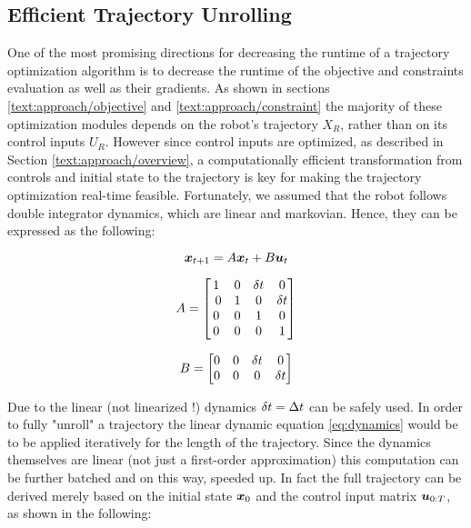 \subsection{Efficient Trajectory Unrolling}
\label{text:approach/runtime/unrolling}
One of the most promising directions for decreasing the runtime of a trajectory optimization algorithm is to decrease the runtime of the objective and constraints evaluation as well as their gradients. As shown in sections \ref{text:approach/objective} and \ref{text:approach/constraint} the majority of these optimization modules depends on the robot's trajectory $X_R$, rather than on its control inputs $U_R$. However since control inputs are optimized, as described in Section \ref{text:approach/overview}, a computationally efficient transformation from controls and initial state to the trajectory is key for making the trajectory optimization real-time feasible.
\newline
Fortunately, we assumed that the robot follows double integrator dynamics, which are linear and markovian. Hence, they can be expressed as the following: 

\begin{equation}
\boldsymbol{x}_{t+1} = A \boldsymbol{x}_t + B \boldsymbol{u}_t
\label{eq:dynamics}
\end{equation}

\begin{minipage}{0.5\textwidth}
$$A = \begin{bmatrix} 1 & 0 & \dt & 0 \\ 0 & 1 & 0 & \dt \\ 0 & 0 & 1 & 0 \\ 0 & 0 & 0 & 1\end{bmatrix}$$
\end{minipage}
\begin{minipage}{0.5\textwidth}
$$B = \begin{bmatrix} 0 & 0 & \delta t & 0 \\ 0 & 0 & 0 & \delta t \end{bmatrix}$$
\end{minipage}

Due to the linear (not linearized !) dynamics $\delta t = \Delta t$ can be safely used. In order to fully "unroll" a trajectory the linear dynamic equation \ref{eq:dynamics} would be to be applied iteratively for the length of the trajectory. Since the dynamics themselves are linear (not just a first-order approximation) this computation can be further batched and on this way, speeded up. In fact the full trajectory can be derived merely based on the initial state $\boldsymbol{x}_0$ and the control input matrix $\boldsymbol{u}_{0:T}$, as shown in the following:

